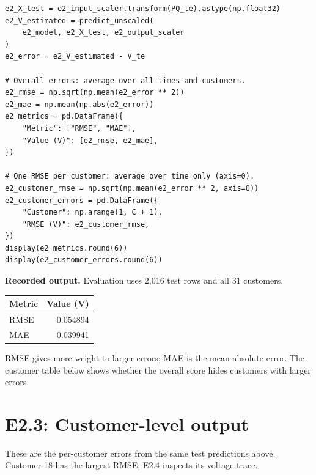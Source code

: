 \documentclass[11pt,a4paper]{article}
\begin{document}
\begin{lstlisting}
e2_X_test = e2_input_scaler.transform(PQ_te).astype(np.float32)
e2_V_estimated = predict_unscaled(
    e2_model, e2_X_test, e2_output_scaler
)
e2_error = e2_V_estimated - V_te

# Overall errors: average over all times and customers.
e2_rmse = np.sqrt(np.mean(e2_error ** 2))
e2_mae = np.mean(np.abs(e2_error))
e2_metrics = pd.DataFrame({
    "Metric": ["RMSE", "MAE"],
    "Value (V)": [e2_rmse, e2_mae],
})

# One RMSE per customer: average over time only (axis=0).
e2_customer_rmse = np.sqrt(np.mean(e2_error ** 2, axis=0))
e2_customer_errors = pd.DataFrame({
    "Customer": np.arange(1, C + 1),
    "RMSE (V)": e2_customer_rmse,
})
display(e2_metrics.round(6))
display(e2_customer_errors.round(6))
\end{lstlisting}

\textbf{Recorded output.} Evaluation uses 2,016 test rows and all
31 customers.

\begin{center}
\begin{tabular}{lr}
\toprule
Metric & Value (V) \\
\midrule
RMSE & 0.054894 \\
MAE & 0.039941 \\
\bottomrule
\end{tabular}
\end{center}

RMSE gives more weight to larger errors; MAE is the mean absolute
error. The customer table below shows whether the overall score hides
customers with larger errors.

\clearpage
\section*{E2.3: Customer-level output}
These are the per-customer errors from the same test predictions above.
Customer 18 has the largest RMSE; E2.4 inspects its voltage trace.
\end{document}
